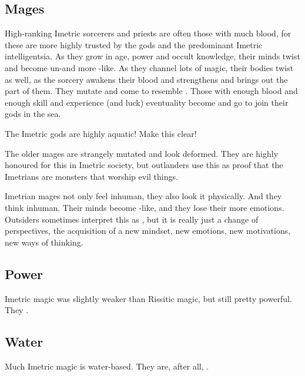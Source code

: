 \subsection{Mages}

High-ranking Imetric sorcerers and priests are often those with much \naga blood, for these are more highly trusted by the gods and the predominant Imetric intelligentsia.
As they grow in age, power and occult  knowledge, their minds twist and become un-\scathaese and more \naga-like. 
As they channel lots of magic, their bodies twist as well, as the \naga sorcery awakens their \naga blood and strengthens and brings out the \naga part of them. 
They mutate and come to resemble \nagae.
Those with enough \naga blood and enough skill and experience (and luck) eventuality become \nagae and go to join their gods in the sea.

The Imetric gods are highly aquatic! 
Make this clear!

The older mages are strangely mutated and look deformed.
They are highly honoured for this in Imetric society, but outlanders use this as proof that the Imetrians are monsters that worship evil things.

Imetrian mages not only feel inhuman, they also look it physically.
And they think inhuman. 
Their minds become \naga-like, and they lose their more \scathaese emotions.
Outsiders sometimes interpret this as , but it is really just a change of perspectives, the acquisition of a new mindset, new emotions, new motivations, new ways of thinking.





\subsection{Power}
Imetric magic was slightly weaker than Rissitic magic, but still pretty powerful. 
They . 





\subsection{Water}
Much Imetric magic is water-based. 
They are, after all, . 















